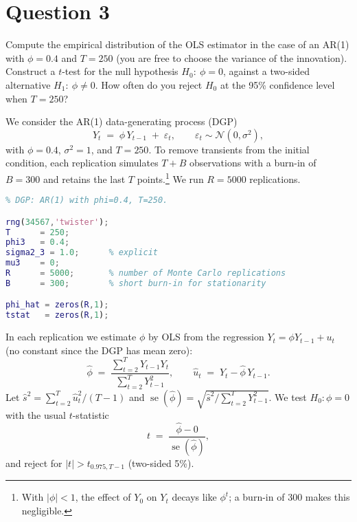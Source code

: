 \documentclass[dvipsnames,11pt]{article}
\begin{document}
\section*{Question 3}
\setcounter{section}{3}

    Compute the empirical distribution of the OLS estimator in the case of an AR(1) with $\phi=0.4$ and $T=250$ (you are free to choose the variance of the innovation). Construct a $t$-test for the null hypothesis $H_0:\ \phi=0$, against a two-sided alternative $H_1:\ \phi\neq 0$. How often do you reject $H_0$ at the 95\% confidence level when $T=250$?

    \begin{solution}

        We consider the AR(1) data-generating process (DGP)
        \begin{equation}
            Y_t \;=\; \phi\,Y_{t-1} \;+\; \varepsilon_t, \qquad \varepsilon_t \sim \mathcal{N}(0,\sigma^2), 
        \end{equation}
        with $\phi=0.4$, $\sigma^2=1$, and $T=250$. To remove transients from the initial condition, each replication simulates $T+B$ observations with a burn-in of $B=300$ and retains the last $T$ points.\footnote{With $|\phi|<1$, the effect of $Y_0$ on $Y_t$ decays like $\phi^t$; a burn-in of 300 makes this negligible.} We run $R=5000$ replications.

\begin{lstlisting}[language=Matlab]
% Empirical distribution of OLS estimator; t-test of H0: phi=0
% DGP: AR(1) with phi=0.4, T=250.

rng(34567,'twister');
T      = 250;
phi3   = 0.4;
sigma2_3 = 1.0;      % explicit
mu3    = 0;
R      = 5000;       % number of Monte Carlo replications
B      = 300;        % short burn-in for stationarity

phi_hat = zeros(R,1);
tstat   = zeros(R,1);
\end{lstlisting}

        In each replication we estimate $\phi$ by OLS from the regression $Y_t=\phi Y_{t-1}+u_t$ (no constant since the DGP has mean zero):
        \[
          \widehat\phi \;=\; 
          \frac{\sum_{t=2}^T Y_{t-1}Y_t}{\sum_{t=2}^T Y_{t-1}^2},
          \qquad 
          \widehat u_t \;=\; Y_t-\widehat\phi\,Y_{t-1}.
        \]
        Let $\widehat s^2=\sum_{t=2}^T \widehat u_t^2/(T-1)$ and
        $\operatorname{se}(\widehat\phi)=\sqrt{\widehat s^2/\sum_{t=2}^T Y_{t-1}^2}$.
        We test $H_0\!:\phi=0$ with the usual $t$-statistic
        \[
          t \;=\; \frac{\widehat\phi-0}{\operatorname{se}(\widehat\phi)},
        \]
        and reject for $|t|>t_{0.975,T-1}$ (two-sided 5\%).


\end{solution}
\end{document}
